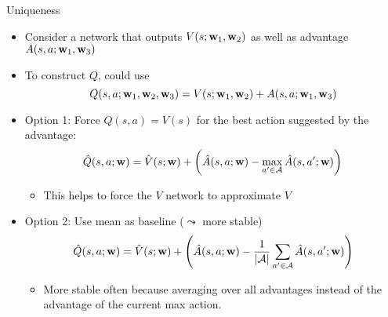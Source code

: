\documentclass[aspectratio=169]{../latex_main/tntbeamer}  %
\begin{document}
\begin{frame}[c]{Uniqueness}
	
	\begin{itemize}
		\item Consider a network that outputs $V(s;\mathbf{w}_1, \mathbf{w}_2)$ as well as advantage $A(s,a; \mathbf{w}_1, \mathbf{w}_3)$
		\item To construct $Q$, could use $$Q(s,a;\mathbf{w}_1, \mathbf{w}_2, \mathbf{w}_3) = V(s;\mathbf{w}_1, \mathbf{w}_2) + A(s,a;\mathbf{w}_1, \mathbf{w}_3)$$
		\item Option 1: Force $Q(s,a) = V(s)$ for the best action suggested by the advantage:\\
		$$\hat{Q}(s,a;\mathbf{w}) = \hat{V}(s;\mathbf{w}) + \left( \hat{A}(s,a;\mathbf{w}) - \max_{a' \in \mathcal{A}} \hat{A}(s,a';\mathbf{w}) \right) $$
		\vspace{-1em}
		\begin{itemize}
			\item This helps to force the $V$ network to approximate $V$
		\end{itemize}
		\item Option 2: Use mean as baseline ($\leadsto$ more stable)\\
		$$\hat{Q}(s,a;\mathbf{w}) = \hat{V}(s;\mathbf{w}) + \left( \hat{A}(s,a;\mathbf{w}) - \frac{1}{|\mathcal{A}|} \sum_{a' \in \mathcal{A}} \hat{A}(s,a';\mathbf{w}) \right) $$
		\vspace{-1em}
		\begin{itemize}
			\item More stable often because averaging over all advantages instead of
			the advantage of the current max action.
		\end{itemize}
	\end{itemize}
	
\end{frame}
\end{document}
